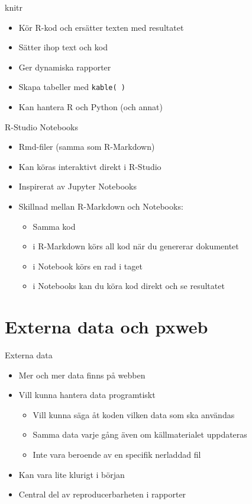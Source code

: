 \documentclass[
  11pt,
  ignorenonframetext,
  handout]{beamer}
\providecommand{\tightlist}{%
  \setlength{\itemsep}{0pt}\setlength{\parskip}{0pt}}
\begin{document}
\begin{frame}{knitr}
\protect\hypertarget{knitr}{}
\begin{itemize}
\tightlist
\item
  Kör R-kod och ersätter texten med resultatet
\item
  Sätter ihop text och kod
\item
  Ger dynamiska rapporter
\item
  Skapa tabeller med \texttt{kable( )}
\item
  Kan hantera R och Python (och annat)
\end{itemize}
\end{frame}

\begin{frame}{R-Studio Notebooks}
\protect\hypertarget{r-studio-notebooks}{}
\begin{itemize}
\tightlist
\item
  Rmd-filer (samma som R-Markdown)
\item
  Kan köras interaktivt direkt i R-Studio
\item
  Inspirerat av Jupyter Notebooks
\item
  Skillnad mellan R-Markdown och Notebooks:

  \begin{itemize}
  \tightlist
  \item
    Samma kod
  \item
    i R-Markdown körs all kod när du genererar dokumentet
  \item
    i Notebook körs en rad i taget
  \item
    i Notebooks kan du köra kod direkt och se resultatet
  \end{itemize}
\end{itemize}
\end{frame}

\hypertarget{externa-data-och-pxweb}{%
\section{Externa data och pxweb}\label{externa-data-och-pxweb}}

\begin{frame}{Externa data}
\protect\hypertarget{externa-data}{}
\begin{itemize}
\tightlist
\item
  Mer och mer data finns på webben
\item
  Vill kunna hantera data programtiskt

  \begin{itemize}
  \tightlist
  \item
    Vill kunna säga åt koden vilken data som ska användas
  \item
    Samma data varje gång även om källmaterialet uppdateras
  \item
    Inte vara beroende av en specifik nerladdad fil
  \end{itemize}
\item
  Kan vara lite klurigt i början
\item
  Central del av reproducerbarheten i rapporter
\end{itemize}
\end{frame}
\end{document}
